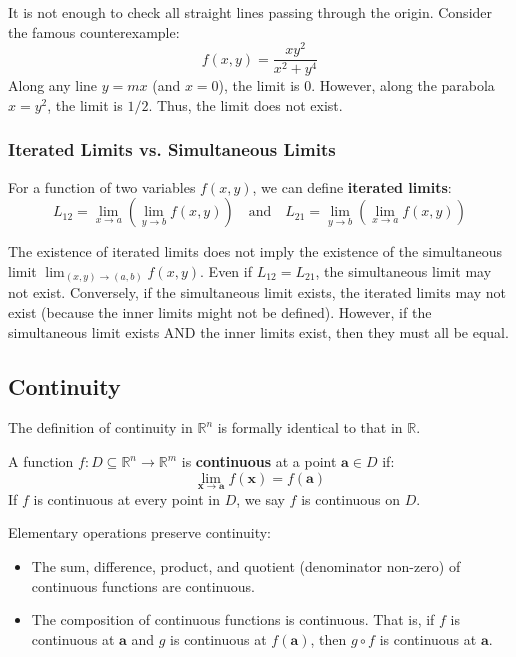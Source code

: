 \begin{remark}
It is not enough to check all straight lines passing through the origin. Consider the famous counterexample:
\[ f(x, y) = \frac{x y^2}{x^2 + y^4} \]
Along any line $y = mx$ (and $x=0$), the limit is $0$. However, along the parabola $x = y^2$, the limit is $1/2$. Thus, the limit does not exist.
\end{remark}

\subsubsection{Iterated Limits vs. Simultaneous Limits}

For a function of two variables $f(x,y)$, we can define \textbf{iterated limits}:
\[ L_{12} = \lim_{x \to a} \left( \lim_{y \to b} f(x, y) \right) \quad \text{and} \quad L_{21} = \lim_{y \to b} \left( \lim_{x \to a} f(x, y) \right) \]

\begin{proposition}
The existence of iterated limits does not imply the existence of the simultaneous limit $\lim_{(x,y) \to (a,b)} f(x,y)$.
Even if $L_{12} = L_{21}$, the simultaneous limit may not exist.
Conversely, if the simultaneous limit exists, the iterated limits may not exist (because the inner limits might not be defined).
However, if the simultaneous limit exists AND the inner limits exist, then they must all be equal.
\end{proposition}

\subsection{Continuity}

The definition of continuity in $\mathbb{R}^n$ is formally identical to that in $\mathbb{R}$.

\begin{definition}[Continuity]
A function $f: D \subseteq \mathbb{R}^n \to \mathbb{R}^m$ is \textbf{continuous} at a point $\mathbf{a} \in D$ if:
\[ \lim_{\mathbf{x} \to \mathbf{a}} f(\mathbf{x}) = f(\mathbf{a}) \]
If $f$ is continuous at every point in $D$, we say $f$ is continuous on $D$.
\end{definition}

Elementary operations preserve continuity:
\begin{itemize}
    \item The sum, difference, product, and quotient (denominator non-zero) of continuous functions are continuous.
    \item The composition of continuous functions is continuous. That is, if $f$ is continuous at $\mathbf{a}$ and $g$ is continuous at $f(\mathbf{a})$, then $g \circ f$ is continuous at $\mathbf{a}$.
\end{itemize}


